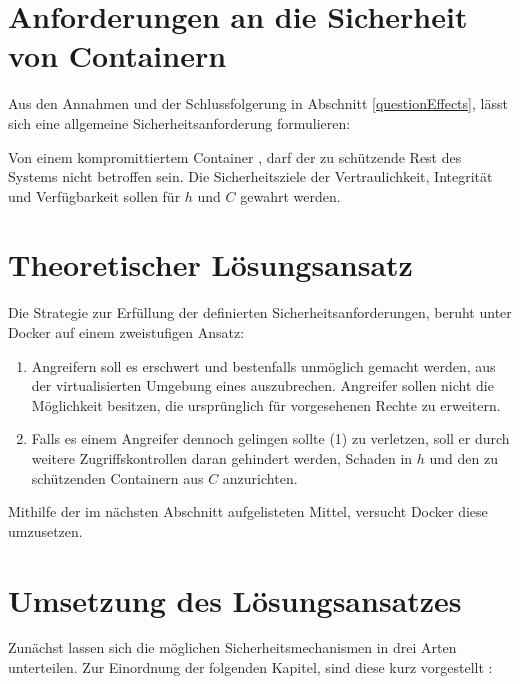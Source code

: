 \documentclass[../main.tex]{subfiles}
\begin{document}

  \section{Anforderungen an die Sicherheit von Containern}
    Aus den Annahmen und der Schlussfolgerung in Abschnitt \ref{questionEffects}, lässt sich eine allgemeine Sicherheitsanforderung formulieren:

    Von einem kompromittiertem Container \cbroken{}, darf der zu schützende Rest des Systems nicht betroffen sein. Die Sicherheitsziele der Vertraulichkeit, Integrität und Verfügbarkeit sollen für \(h\) und \(C\) gewahrt werden.

  \section{Theoretischer Lösungsansatz}
    Die Strategie zur Erfüllung der definierten Sicherheitsanforderungen, beruht unter Docker auf einem zweistufigen Ansatz:

    \begin{enumerate}[label=(\arabic*)]
      \item Angreifern soll es erschwert und bestenfalls unmöglich gemacht werden, aus der virtualisierten Umgebung eines \cbroken{} auszubrechen. Angreifer sollen nicht die Möglichkeit besitzen, die ursprünglich für \cbroken{} vorgesehenen Rechte zu erweitern.
      \item Falls es einem Angreifer dennoch gelingen sollte (1) zu verletzen, soll er durch weitere Zugriffskontrollen daran gehindert werden, Schaden in \(h\) und den zu schützenden Containern aus \(C\) anzurichten.
    \end{enumerate}

    Mithilfe der im nächsten Abschnitt aufgelisteten Mittel, versucht Docker diese umzusetzen.


  \section{Umsetzung des Lösungsansatzes} %
  \label{questionRealization}
    Zunächst lassen sich die möglichen Sicherheitsmechanismen in drei Arten unterteilen. Zur Einordnung der folgenden Kapitel, sind diese kurz vorgestellt \cite[S.40]{CISSP}\cite[S.23]{nist}:
\end{document}
